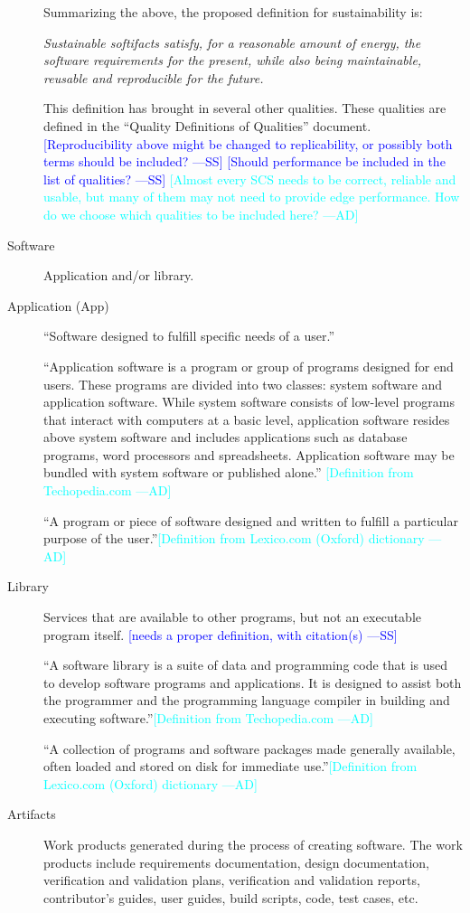 \documentclass[12pt]{article}
\newcommand{\authornote}[3]{\textcolor{#1}{[#3 ---#2]}}
\newcommand{\authornote}[3]{}
\newcommand{\wss}[1]{\authornote{blue}{SS}{#1}} %
\newcommand{\ad}[1]{\authornote{cyan}{AD}{#1}} %
\begin{document}
\begin{description}
  Summarizing the above, the proposed definition for sustainability is:

  \emph{Sustainable softifacts satisfy, for a reasonable amount of energy, the
    software requirements for the present, while also being maintainable,
    reusable and reproducible for the future.}

This definition has brought in several other qualities.  These qualities are
defined in the ``Quality  Definitions of Qualities'' document.
\wss{Reproducibility above might be changed to replicability, or possibly both
  terms should be included?}
\wss{Should performance be included in the list of qualities?}
\ad{Almost every SCS needs to be correct, reliable and usable, but many of them
may not need to provide edge performance. How do we choose which qualities to be
included here?}

\item[Software] Application and/or library.
\item[Application (App)] ``Software designed to fulfill specific needs of a
  user.'' \citep{IEEEStdGlossarySET1990}

``Application software is a program or group of programs designed for end users.
These programs are divided into two classes: system software and application
software. While system software consists of low-level programs that interact
with computers at a basic level, application software resides above system
software and includes applications such as database programs, word processors
and spreadsheets. Application software may be bundled with system software or
published alone.''\citep{TechopediaApplication2018} \ad{Definition from
Techopedia.com}

``A program or piece of software designed and written to fulfill a particular
purpose of the user.''\citep{OxfordApplication2020}\ad{Definition from
Lexico.com (Oxford) dictionary}

\item[Library] Services that are available to other programs, but not an
  executable program itself. \wss{needs a
    proper definition, with citation(s)}

``A software library is a suite of data and programming code that is used to
develop software programs and applications. It is designed to assist both the
programmer and the programming language compiler in building and executing
software.''\citep{TechopediaLibrary2016}\ad{Definition from Techopedia.com}

``A collection of programs and software packages made generally available, often
loaded and stored on disk for immediate
use.''\citep{OxfordLibrary2020}\ad{Definition from Lexico.com (Oxford)
dictionary}

\item[Artifacts] Work products generated during the process of creating
  software.  The work products include requirements documentation, design
  documentation, verification and validation plans, verification and validation
  reports, contributor's guides, user guides, build scripts, code, test cases,
  etc.
\end{description}
\end{document}
